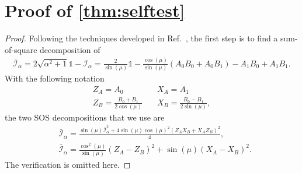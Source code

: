 \documentclass[11pt,letterpaper]{article}
\newcommand{\1}{\mathbb{1}}
\newcommand{\I}{\mathcal{I}}
\theoremstyle{definition}
\begin{document}


\appendix
\section{Proof of \cref{thm:selftest} }
\label{sec:selftest}
\begin{proof}
Following the techniques developed in Ref.~\cite{bamps2015}, the first step is to find a sum-of-square decomposition of 
\begin{align}
	\bar{\I}_\alpha = 2\sqrt{\alpha^2+1} \1 - \I_\alpha
	= \frac{2}{\sin(\mu)} \1 - \frac{\cos(\mu)}{\sin(\mu)}(A_0B_0+A_0B_1) -  A_1B_0 + A_1B_1.
\end{align} 
With the following notation
\begin{align*}
	Z_A = A_0 &\quad X_A = A_1\\
	Z_B = \frac{B_0+B_1}{2\cos(\mu)} &\quad X_B = \frac{B_0-B_1}{2\sin(\mu)},
\end{align*}
the two SOS decompositions that we use are
\begin{align}
	\label{eq:sos1}&\bar{\I}_\alpha = \frac{\sin(\mu)\bar{\I}_\alpha^2 + 4\sin(\mu)\cos(\mu)^2(Z_AX_B+X_AZ_B)^2}{4},\\
	\label{eq:sos2}&\bar{\I}_\alpha = \frac{\cos^2(\mu)}{\sin(\mu)}(Z_A-Z_B)^2 + \sin(\mu) (X_A-X_B)^2.
\end{align}
The verification is omitted here.


\end{proof}
\end{document}
